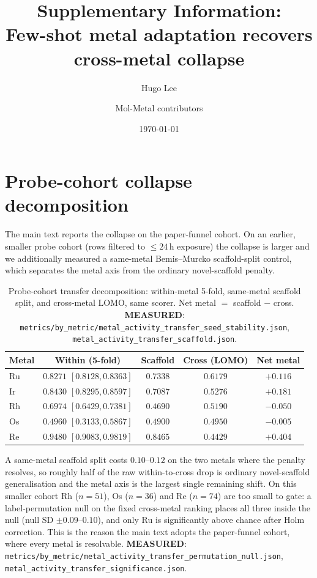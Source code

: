 \documentclass[11pt]{article}
\title{Supplementary Information:\\
Few-shot metal adaptation recovers cross-metal collapse}
\author{Hugo Lee \and Mol-Metal contributors}
\date{\today}
\newcommand{\MEASURED}{\textbf{MEASURED}}
\begin{document}
\maketitle

\section{Probe-cohort collapse decomposition}
\label{sec:si:decomp}

The main text reports the collapse on the paper-funnel cohort. On an earlier,
smaller probe cohort (rows filtered to $\leq24$\,h exposure) the collapse is
larger and we additionally measured a same-metal Bemis--Murcko scaffold-split
control, which separates the metal axis from the ordinary novel-scaffold
penalty.

\begin{table}[h]
\centering
\caption{Probe-cohort transfer decomposition: within-metal 5-fold, same-metal
scaffold split, and cross-metal LOMO, same scorer. Net metal $=$ scaffold
$-$ cross. \MEASURED:
\texttt{metrics/by\_metric/metal\_activity\_transfer\_seed\_stability.json},
\texttt{metal\_activity\_transfer\_scaffold.json}.}
\begin{tabular}{lcccc}
\toprule
Metal & Within (5-fold) & Scaffold & Cross (LOMO) & Net metal \\
\midrule
Ru & $0.8271$ $[0.8128, 0.8363]$ & $0.7338$ & $0.6179$ & $+0.116$ \\
Ir & $0.8430$ $[0.8295, 0.8597]$ & $0.7087$ & $0.5276$ & $+0.181$ \\
Rh & $0.6974$ $[0.6429, 0.7381]$ & $0.4690$ & $0.5190$ & $-0.050$ \\
Os & $0.4960$ $[0.3133, 0.5867]$ & $0.4900$ & $0.4950$ & $-0.005$ \\
Re & $0.9480$ $[0.9083, 0.9819]$ & $0.8465$ & $0.4429$ & $+0.404$ \\
\bottomrule
\end{tabular}
\end{table}

A same-metal scaffold split costs $0.10$--$0.12$ on the two metals where the
penalty resolves, so roughly half of the raw within-to-cross drop is ordinary
novel-scaffold generalisation and the metal axis is the largest single remaining
shift. On this smaller cohort Rh ($n=51$), Os ($n=36$) and Re ($n=74$) are too
small to gate: a label-permutation null on the fixed cross-metal ranking places
all three inside the null (null SD $\pm0.09$--$0.10$), and only Ru is
significantly above chance after Holm correction. This is the reason the main
text adopts the paper-funnel cohort, where every metal is resolvable.
\MEASURED: \texttt{metrics/by\_metric/metal\_activity\_transfer\_permutation\_null.json},
\texttt{metal\_activity\_transfer\_significance.json}.
\end{document}
